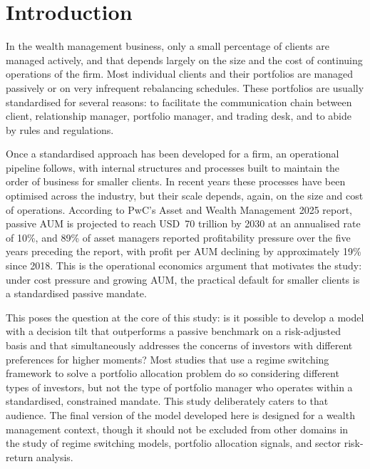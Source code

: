 \documentclass[12pt, a4paper]{article}
\begin{document}
\clearpage
\clearpage
\section{Introduction}

In the wealth management business, only a small percentage of clients are managed actively,
and that depends largely on the size and the cost of continuing operations of the firm. Most
individual clients and their portfolios are managed passively or on very infrequent rebalancing
schedules. These portfolios are usually standardised for several reasons: to facilitate the
communication chain between client, relationship manager, portfolio manager, and trading desk,
and to abide by rules and regulations.

Once a standardised approach has been developed for a firm, an operational pipeline follows,
with internal structures and processes built to maintain the order of business for smaller
clients. In recent years these processes have been optimised across the industry, but their
scale depends, again, on the size and cost of operations. According to PwC's Asset and Wealth
Management 2025 report, passive AUM is projected to reach USD~70 trillion by 2030 at an
annualised rate of 10\%, and 89\% of asset managers reported profitability pressure over the
five years preceding the report, with profit per AUM declining by approximately 19\% since 2018.
This is the operational economics argument that motivates the study: under cost pressure and
growing AUM, the practical default for smaller clients is a standardised passive mandate.

This poses the question at the core of this study: is it possible to develop a model with a
decision tilt that outperforms a passive benchmark on a risk-adjusted basis and that
simultaneously addresses the concerns of investors with different preferences for higher moments?
Most studies that use a regime switching framework to solve a portfolio allocation problem do so
considering different types of investors, but not the type of portfolio manager who operates
within a standardised, constrained mandate. This study deliberately caters to that audience.
The final version of the model developed here is designed for a wealth management context,
though it should not be excluded from other domains in the study of regime switching models,
portfolio allocation signals, and sector risk-return analysis.
\end{document}
